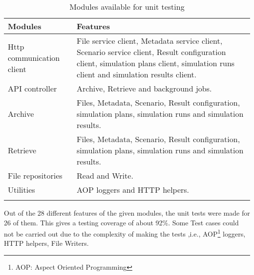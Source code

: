 \begin{longtable}{|p{3cm}|p{10cm}|}
    \hline
        \textbf{Modules} & \textbf{Features}\\
    \hline
        Http communication client & File service client, Metadata service client, Scenario service client, Result configuration client, simulation plans client, 
        simulation runs client and simulation results client.\\    
    \hline
        API controller & Archive, Retrieve and background jobs.\\    
    \hline
        Archive & Files, Metadata, Scenario, Result configuration, simulation plans, simulation runs and simulation results.\\  
    \hline
        Retrieve & Files, Metadata, Scenario, Result configuration, simulation plans, simulation runs and simulation results.\\ 
    \hline
        File repositories & Read and Write.\\ 
    \hline
        Utilities & AOP loggers and HTTP helpers.\\ 
    \hline
    \caption{Modules available for unit testing}
    \label{table:unitTestCov} 
\end{longtable}

Out of the 28 different features of the given modules, the unit tests were made for 26 of them. This gives a testing coverage of about
92\%. Some Test cases could not be carried out due to the complexity of making the tests ,i.e., AOP\footnote{AOP: Aspect Oriented Programming} loggers, HTTP helpers, File Writers.